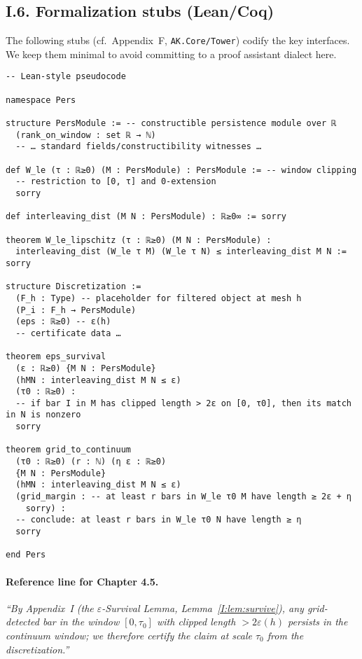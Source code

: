 \documentclass[11pt]{article}
\numberwithin{equation}{section}
\theoremstyle{plain}
\theoremstyle{definition}
\theoremstyle{remark}
\theoremstyle{plain}
\theoremstyle{definition}
\numberwithin{equation}{section}
\theoremstyle{definition}
\numberwithin{equation}{section}
\theoremstyle{plain}
\theoremstyle{definition}
\theoremstyle{remark}
\begin{document}
\subsection*{I.6. Formalization stubs (Lean/Coq)}
The following stubs (cf.\ Appendix~F, \texttt{AK.Core/Tower}) codify the key interfaces. We keep them minimal to avoid committing to a proof assistant dialect here.

\begin{verbatim}
-- Lean-style pseudocode

namespace Pers

structure PersModule := -- constructible persistence module over ℝ
  (rank_on_window : set ℝ → ℕ)
  -- … standard fields/constructibility witnesses …

def W_le (τ : ℝ≥0) (M : PersModule) : PersModule := -- window clipping
  -- restriction to [0, τ] and 0-extension
  sorry

def interleaving_dist (M N : PersModule) : ℝ≥0∞ := sorry

theorem W_le_lipschitz (τ : ℝ≥0) (M N : PersModule) :
  interleaving_dist (W_le τ M) (W_le τ N) ≤ interleaving_dist M N := sorry

structure Discretization :=
  (F_h : Type) -- placeholder for filtered object at mesh h
  (P_i : F_h → PersModule)
  (eps : ℝ≥0) -- ε(h)
  -- certificate data …

theorem eps_survival
  (ε : ℝ≥0) {M N : PersModule}
  (hMN : interleaving_dist M N ≤ ε)
  (τ0 : ℝ≥0) :
  -- if bar I in M has clipped length > 2ε on [0, τ0], then its match in N is nonzero
  sorry

theorem grid_to_continuum
  (τ0 : ℝ≥0) (r : ℕ) (η ε : ℝ≥0)
  {M N : PersModule}
  (hMN : interleaving_dist M N ≤ ε)
  (grid_margin : -- at least r bars in W_le τ0 M have length ≥ 2ε + η
    sorry) :
  -- conclude: at least r bars in W_le τ0 N have length ≥ η
  sorry

end Pers
\end{verbatim}

\paragraph{Reference line for Chapter 4.5.}
\emph{“By Appendix~I (the \(\varepsilon\)-Survival Lemma, Lemma~\ref{I:lem:survive}), any grid-detected bar in the window \([0,\tau_0]\) with clipped length \(>2\varepsilon(h)\) persists in the continuum window; we therefore certify the claim at scale \(\tau_0\) from the discretization.”}
\end{document}

